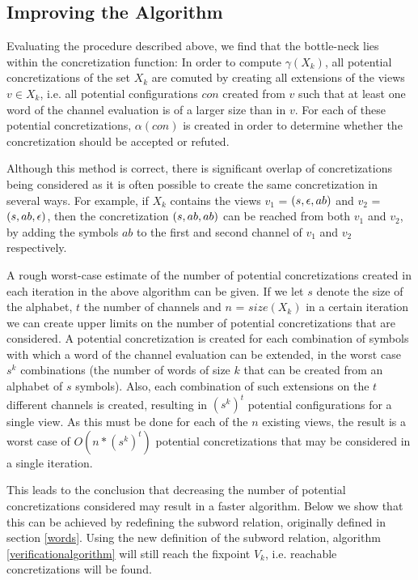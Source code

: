 \subsection{Improving the Algorithm}
Evaluating the procedure described above, we find that the bottle-neck lies within the concretization function:
 In order to compute $\gamma(X_k)$, all potential concretizations of the set $X_k$ are comuted by creating all extensions of the views $v \in X_k$, i.e. all potential configurations $con$ created from $v$ such that at least one word of the channel evaluation is of a larger size than in $v$. For each of these potential concretizations, $\alpha(con)$ is created in order to determine whether the concretization should be accepted or refuted.

Although this method is correct, there is significant overlap of concretizations being considered as it is often possible to create the same concretization  in several ways. For example, if $X_k$ contains the views $v_1$ = $(s, \epsilon, ab)$ and $v_2$ = $(s, ab, \epsilon)$, then the concretization $(s, ab,ab)$ can be reached from both $v_1$ and $v_2$, by adding the symbols $ab$ to the first and second channel of $v_1$ and $v_2$ respectively.

A rough worst-case estimate of the number of potential concretizations created in each iteration in the above algorithm can be given. If we let $s$ denote the size of the alphabet, $t$ the number of channels and $n$ = $size(X_k)$ in a certain iteration we can create upper limits on the number of potential concretizations that are considered. A potential concretization is created for each combination of symbols with which a word of the channel evaluation can be extended, in the worst case $s^k$ combinations (the number of words of size $k$ that can be created from an alphabet of $s$ symbols). Also, each combination of such extensions on the $t$ different channels is created, resulting in $(s^k)^t$ potential configurations for a single view. As this must be done for each of the $n$ existing views, the result is a worst case of $O(n*(s^k)^t)$ potential concretizations that may be considered in a single iteration.

This leads to the conclusion that decreasing the number of potential concretizations considered may result in a faster algorithm. Below we show that this can be achieved by redefining the subword relation, originally defined in section \ref{words}. Using the new definition of the subword relation, algorithm \ref{verificationalgorithm} will still reach the fixpoint $V_k$, i.e. reachable concretizations will be found.


